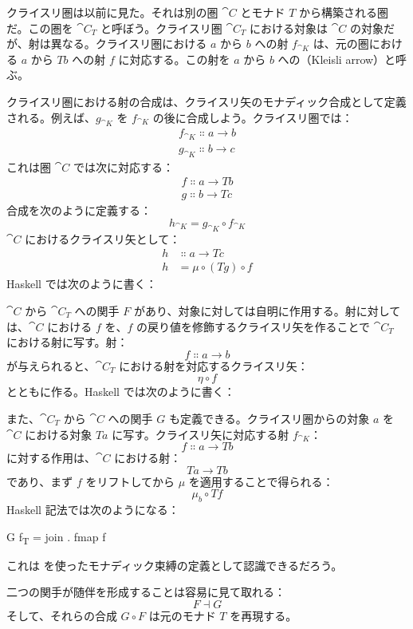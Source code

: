 クライスリ圏は以前に見た。それは別の圏 $\cat{C}$ とモナド $T$ から構築される圏だ。この圏を $\cat{C}_T$ と呼ぼう。クライスリ圏 $\cat{C}_T$ における対象は $\cat{C}$ の対象だが、射は異なる。クライスリ圏における $a$ から $b$ への射 $f_{\cat{K}}$ は、元の圏における $a$ から $T b$ への射 $f$ に対応する。この射を $a$ から $b$ への（Kleisli arrow）と呼ぶ。

クライスリ圏における射の合成は、クライスリ矢のモナディック合成として定義される。例えば、$g_{\cat{K}}$ を $f_{\cat{K}}$ の後に合成しよう。クライスリ圏では：
\begin{gather*}
  f_{\cat{K}} \Colon a \to b \\
  g_{\cat{K}} \Colon b \to c
\end{gather*}
これは圏 $\cat{C}$ では次に対応する：
\begin{gather*}
  f \Colon a \to T b \\
  g \Colon b \to T c
\end{gather*}
合成を次のように定義する：
\[h_{\cat{K}} = g_{\cat{K}} \circ f_{\cat{K}}\]
$\cat{C}$ におけるクライスリ矢として：
\begin{align*}
  h & \Colon a \to T c          \\
  h & = \mu \circ (T g) \circ f
\end{align*}
Haskell では次のように書く：

$\cat{C}$ から $\cat{C}_T$ への関手 $F$ があり、対象に対しては自明に作用する。射に対しては、$\cat{C}$ における $f$ を、$f$ の戻り値を修飾するクライスリ矢を作ることで $\cat{C}_T$ における射に写す。射：
\[f \Colon a \to b\]
が与えられると、$\cat{C}_T$ における射を対応するクライスリ矢：
\[\eta \circ f\]
とともに作る。Haskell では次のように書く：

また、$\cat{C}_T$ から $\cat{C}$ への関手 $G$ も定義できる。クライスリ圏からの対象 $a$ を $\cat{C}$ における対象 $T a$ に写す。クライスリ矢に対応する射 $f_{\cat{K}}$：
\[f \Colon a \to T b\]
に対する作用は、$\cat{C}$ における射：
\[T a \to T b\]
であり、まず $f$ をリフトしてから $\mu$ を適用することで得られる：
\[\mu_{b} \circ T f\]
Haskell 記法では次のようになる：

\begin{snipv}
G f\textsubscript{T} = join . fmap f
\end{snipv}
これは  を使ったモナディック束縛の定義として認識できるだろう。

二つの関手が随伴を形成することは容易に見て取れる：
\[F \dashv G\]
そして、それらの合成 $G \circ F$ は元のモナド $T$ を再現する。

